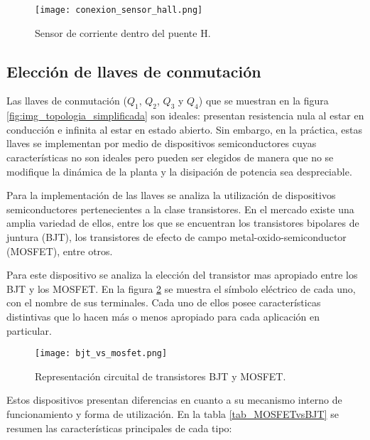 \begin{figure}[H]
	\centering
	\texttt{[image: conexion\_sensor\_hall.png]}
	\caption{Sensor de corriente dentro del puente H.}
	\label{fig:img_conexion_sensor}
\end{figure}



\subsection{Elección de llaves de conmutación} \label{sec_eleccion_llaves}

Las llaves de conmutación ($Q_1$, $Q_2$, $Q_3$ y $Q_4$) que se muestran en la figura \ref{fig:img_topologia_simplificada} son ideales: presentan resistencia nula al estar en conducción e infinita al estar en estado abierto. Sin embargo, en la práctica, estas llaves se implementan por medio de dispositivos semiconductores cuyas características no son ideales pero pueden ser elegidos de manera que no se modifique la dinámica de la planta y la disipación de potencia sea despreciable.

Para la implementación de las llaves se analiza la utilización de dispositivos semiconductores pertenecientes a la clase transistores. En el mercado existe una amplia variedad de ellos, entre los que se encuentran los transistores bipolares de juntura (BJT), los transistores de efecto de campo metal-oxido-semiconductor (MOSFET), entre otros. 

Para este dispositivo se analiza la elección del transistor mas apropiado entre los BJT y los MOSFET. En la figura \ref{fig:img_bjt_vs_mosfet} se muestra el símbolo eléctrico de cada uno, con el nombre de sus terminales. Cada uno de ellos posee características distintivas que lo hacen más o menos apropiado para cada aplicación en particular. 

\begin{figure}[H]
	\centering
	\texttt{[image: bjt\_vs\_mosfet.png]}
	\caption{Representación circuital de transistores BJT y MOSFET.}
	\label{fig:img_bjt_vs_mosfet}
\end{figure}

Estos dispositivos presentan diferencias en cuanto a su mecanismo interno de funcionamiento y forma de utilización. En la tabla \ref{tab_MOSFETvsBJT} se resumen las características principales de cada tipo:


